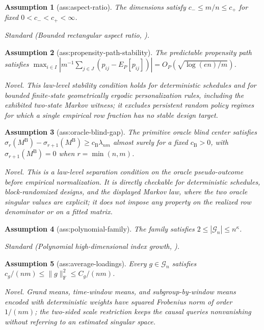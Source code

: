 \documentclass{article}
\newtheorem{assumption}{Assumption}
\begin{document}
\begin{assumption}[ass:aspect-ratio]\label{ass:aspect-ratio}
The dimensions satisfy \(c_-\le m/n\le c_+\) for fixed \(0<c_-<c_+<\infty\).
\par\smallskip\noindent\emph{Standard} (Bounded rectangular aspect ratio, \cite{CaiLiChiPoorChen2021Subspace}).
\end{assumption}

\begin{assumption}[ass:propensity-path-stability]\label{ass:propensity-path-stability}
The predictable propensity path satisfies \(\max_{i\in I}|m^{-1}\sum_{j\in J}(p_{ij}-E_P[p_{ij}])|=O_P(\sqrt{\log(en)/m})\).
\par\smallskip\noindent\emph{Novel.} This law-level stability condition holds for deterministic schedules and for bounded finite-state geometrically ergodic personalization rules, including the exhibited two-state Markov witness; it excludes persistent random policy regimes for which a single empirical row fraction has no stable design target.
\end{assumption}

\begin{assumption}[ass:oracle-blind-gap]\label{ass:oracle-blind-gap}
The primitive oracle blind center satisfies \(\sigma_r(M^{\mathrm B})-\sigma_{r+1}(M^{\mathrm B})\ge c_{\mathrm B}\lambda_{nm}\) almost surely for a fixed \(c_{\mathrm B}>0\), with \(\sigma_{r+1}(M^{\mathrm B})=0\) when \(r=\min(n,m)\).
\par\smallskip\noindent\emph{Novel.} This is a law-level separation condition on the oracle pseudo-outcome before empirical normalization. It is directly checkable for deterministic schedules, block-randomized designs, and the displayed Markov law, where the two oracle singular values are explicit; it does not impose any property on the realized row denominator or on a fitted matrix.
\end{assumption}

\begin{assumption}[ass:polynomial-family]\label{ass:polynomial-family}
The family satisfies \(2\le|\mathcal G_n|\le n^{\kappa}\).
\par\smallskip\noindent\emph{Standard} (Polynomial high-dimensional index growth, \cite{BelloniOliveira2018MartingaleCLT}).
\end{assumption}

\begin{assumption}[ass:average-loadings]\label{ass:average-loadings}
Every \(g\in\mathcal G_n\) satisfies \(c_g/(nm)\le\lVert g\rVert_{\mathrm F}^2\le C_g/(nm)\).
\par\smallskip\noindent\emph{Novel.} Grand means, time-window means, and subgroup-by-window means encoded with deterministic weights have squared Frobenius norm of order \(1/(nm)\); the two-sided scale restriction keeps the causal queries nonvanishing without referring to an estimated singular space.
\end{assumption}
\end{document}
